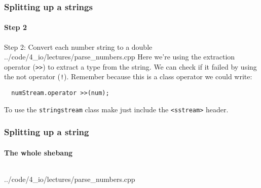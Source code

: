 \documentclass[handout]{beamer}
\begin{document}
\begin{frame}[fragile]
  \frametitle{Splitting up a strings}
  \framesubtitle{Step 2}
  
  \begin{block}{Step 2: Convert each number string to a double}
  		{../code/4_io/lectures/parse_numbers.cpp}
    Here we're using the extraction operator (\texttt{>>}) to extract a  type from the string.\pause{} \newline
    We can check if it failed by using the not operator (\texttt{!}).  Remember because this is a class operator we could write:
    \begin{lstlisting}
  numStream.operator >>(num);
    \end{lstlisting}
	\end{block}
	To use the \texttt{stringstream} class make just include the \texttt{<sstream>} header.

\end{frame}

\begin{frame}[fragile]
  \frametitle{Splitting up a string}
  \framesubtitle{The whole shebang}
  \begin{columns}
    \begin{column}[T]{0.75\linewidth}
  			{../code/4_io/lectures/parse_numbers.cpp}
  	\end{column}
  	\begin{column}[T]{0.25\linewidth}
  	\end{column}
  \end{columns}  

\end{frame}
\end{document}
